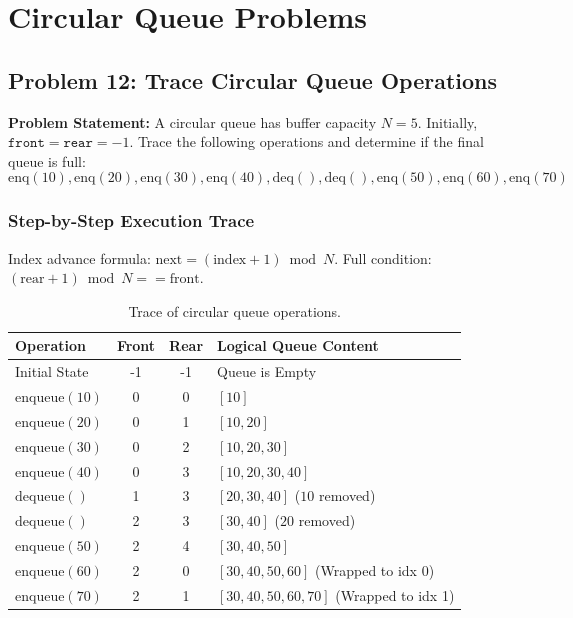 \section{Circular Queue Problems}

\subsection{Problem 12: Trace Circular Queue Operations}

\textbf{Problem Statement:} A circular queue has buffer capacity $N = 5$. Initially, $\texttt{front} = \texttt{rear} = -1$. Trace the following operations and determine if the final queue is full:
\[
\text{enq}(10), \text{enq}(20), \text{enq}(30), \text{enq}(40), \text{deq}(), \text{deq}(), \text{enq}(50), \text{enq}(60), \text{enq}(70)
\]

\subsubsection*{Step-by-Step Execution Trace}
Index advance formula: $\text{next} = (\text{index} + 1) \bmod N$. Full condition: $(\text{rear} + 1) \bmod N == \text{front}$.

\begin{table}[htbp]
\centering
\small
\begin{tabularx}{\textwidth}{l c c X}
\toprule
\textbf{Operation} & \textbf{Front} & \textbf{Rear} & \textbf{Logical Queue Content} \\
\midrule
Initial State & -1 & -1 & Queue is Empty \\
$\text{enqueue}(10)$ & 0 & 0 & $[10]$ \\
$\text{enqueue}(20)$ & 0 & 1 & $[10, 20]$ \\
$\text{enqueue}(30)$ & 0 & 2 & $[10, 20, 30]$ \\
$\text{enqueue}(40)$ & 0 & 3 & $[10, 20, 30, 40]$ \\
$\text{dequeue}()$   & 1 & 3 & $[20, 30, 40]$ ($10$ removed) \\
$\text{dequeue}()$   & 2 & 3 & $[30, 40]$ ($20$ removed) \\
$\text{enqueue}(50)$ & 2 & 4 & $[30, 40, 50]$ \\
$\text{enqueue}(60)$ & 2 & 0 & $[30, 40, 50, 60]$ (Wrapped to idx 0) \\
$\text{enqueue}(70)$ & 2 & 1 & $[30, 40, 50, 60, 70]$ (Wrapped to idx 1) \\
\bottomrule
\end{tabularx}
\caption{Trace of circular queue operations.}
\end{table}

